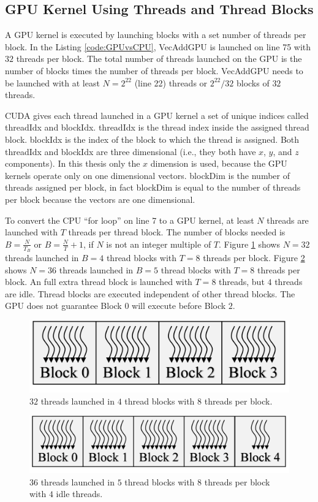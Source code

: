 \subsection{GPU Kernel Using Threads and Thread Blocks}
A GPU kernel is executed by launching blocks with a set number of threads per block.
In the Listing \ref{code:GPUvsCPU}, VecAddGPU is launched on line 75 with $32$ threads per block.
The total number of threads launched on the GPU is the number of blocks times the number of threads per block.
VecAddGPU needs to be launched with at least $N = 2^{22}$ (line 22) threads or $2^{22}/32$ blocks of $32$ threads.

CUDA gives each thread launched in a GPU kernel a set of unique indices called threadIdx and blockIdx.
threadIdx is the thread index inside the assigned thread block.
blockIdx is the index of the block to which the thread is assigned.
Both threadIdx and blockIdx are three dimensional (i.e., they both have $x$, $y$, and $z$ components).
In this thesis only the $x$ dimension is used, because the GPU kernels operate only on one dimensional vectors.
blockDim is the number of threads assigned per block, in fact blockDim is equal to the number of threads per block because the vectors are one dimensional.

To convert the CPU ``for loop'' on line 7 to a GPU kernel, at least $N$ threads are launched with $T$ threads per thread block.
The number of blocks needed is $B = \frac{N}{T_B}$ or $B = \frac{N}{T}+1$, if $N$ is not an integer multiple of $T$.
Figure \ref{fig:threadsBlocks32} shows $N = 32$ threads launched in $B = 4$ thread blocks with $T = 8$ threads per block.
Figure \ref{fig:threadsBlocks36} shows $N = 36$ threads launched in $B = 5$ thread blocks with $T = 8$ threads per block. 
An full extra thread block is launched with $T = 8$ threads, but $4$ threads are idle.
Thread blocks are executed independent of other thread blocks.
The GPU does not guarantee Block $0$ will execute before Block $2$.
\begin{figure}
	\centering\includegraphics[width=4in/100*55]{figures/gpu_intro/threadsBlocks32.pdf}
	\caption{$32$ threads launched in $4$ thread blocks with $8$ threads per block.}
	\label{fig:threadsBlocks32}
\end{figure}
\begin{figure}
	\centering\includegraphics[width=5in/100*55]{figures/gpu_intro/threadsBlocks36.pdf}
	\caption{$36$ threads launched in $5$ thread blocks with $8$ threads per block with $4$ idle threads.}
	\label{fig:threadsBlocks36}
\end{figure}

